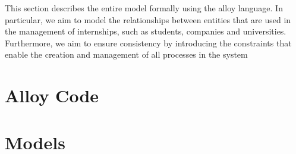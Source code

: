 This section describes the entire model formally using the alloy language.
In particular, we aim to model the relationships between entities that are used in the management of internships, such as students, companies and universities. Furthermore, we aim to ensure consistency by introducing the constraints that enable the creation and management of all processes in the system


\section{Alloy Code}

\pagebreak

\section{Models}
